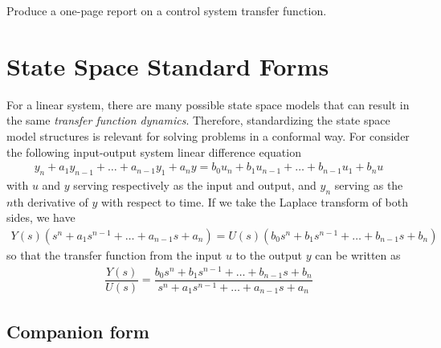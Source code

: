 \begin{homework}
	Produce a one-page report on a control system transfer function.
\end{homework}
%
\section{State Space Standard Forms}
For a linear system, there are many possible state space models that can result in the same \textit{transfer function dynamics}. Therefore, standardizing the state space model structures is 
relevant for solving problems in a conformal way. For consider the following input-output system linear difference equation
%
\begin{align}
	y_n + a_1 y_{n-1}  + \ldots + a_{n-1} y_1 + a_n y = b_0 u_n + b_1 u_{n-1} + \ldots + b_{n-1} u_1 + b_n u
\end{align}
%
with $u$ and $y$ serving respectively as the input and output, and $y_n$ serving as the $n$th derivative of $y$ with respect to time. If we take the Laplace transform of both sides, we have
%
\begin{align}
	Y(s) \left(s^n + a_1s^{n-1}+\ldots + a_{n-1}s + a_n\right) = U(s)\left(b_0 s^n + b_1 s^{n-1} + \ldots + b_{n-1} s + b_n\right)
\end{align}
%
so that the transfer function from the input $u$ to the output $y$ can be written as 
%
\begin{align}
	\dfrac{Y(s)}{U(s)} = \dfrac{b_0 s^n + b_1 s^{n-1} + \ldots + b_{n-1} s + b_n}{s^n + a_1s^{n-1}+\ldots + a_{n-1}s + a_n}
	\label{eq:transfer_fcn}
\end{align}

\subsection{Companion form}

